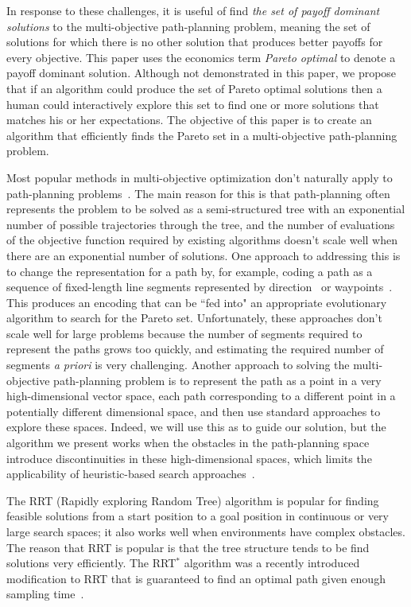 \documentclass[conference]{IEEEtran}
\begin{document}
In response to these challenges, it is useful of find {\em the set of payoff dominant solutions} to the multi-objective path-planning problem, meaning the set of solutions for which there is no other solution that produces better payoffs for every objective.   
This paper uses the economics term {\em Pareto optimal} to denote a payoff dominant solution.  Although not demonstrated in this paper, we propose that if an algorithm could produce the set of Pareto optimal solutions then a human could interactively explore this set to find one or more solutions that matches his or her expectations. 
The objective of this paper is to create an algorithm that efficiently finds the Pareto set in a multi-objective path-planning problem.

Most popular methods in multi-objective optimization don't naturally apply to path-planning problems~\cite{4358754, 6600851}.
The main reason for this is that path-planning often represents the problem to be solved as a semi-structured tree with an exponential number of possible trajectories through the tree, and the number of evaluations of the objective function required by existing algorithms doesn't scale well when there are an exponential number of solutions. 
One approach to addressing this is to change the representation for a path by, for example, coding a path as a sequence of fixed-length line segments represented by direction~\cite{Ahmed2013,howlett2006learning} or waypoints~\cite{5160222,Pires2004}.  
This produces an encoding that can be ``fed into" an appropriate evolutionary algorithm to search for the Pareto set. 
Unfortunately, these approaches don't scale well for large problems because the number of segments required to represent the paths grows too quickly, and estimating the required number of segments {\em a priori} is very challenging.  
Another approach to solving the multi-objective path-planning problem is to represent the path as a point in a very high-dimensional vector space, each path corresponding to a different point in a potentially different dimensional space, and then use standard approaches to explore these spaces. 
Indeed, we will use this as to guide our solution, but the algorithm we present works when the obstacles in the path-planning space introduce discontinuities in these high-dimensional spaces, which limits the applicability of heuristic-based search approaches~\cite{5160222,4358754}.

The RRT (Rapidly exploring Random Tree) algorithm is popular for finding feasible solutions from a start position to a goal position in continuous or very large search spaces; it also works well when environments have complex obstacles. 
The reason that RRT is popular is that the tree structure tends to be find solutions very efficiently.
The RRT$^{*}$ algorithm was a recently introduced modification to RRT that is guaranteed to find an optimal path given enough sampling time~\cite{Karaman:2011:SAO:2000201.2000209,Karaman.Frazzoli:RSS10}.
\end{document}
